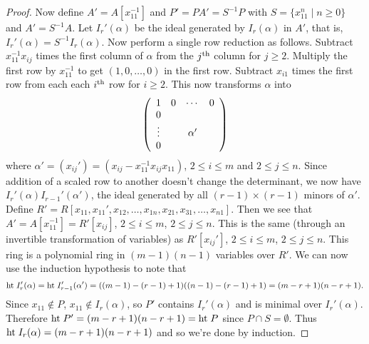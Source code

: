 \documentclass{article}
\newcommand{\Ht}{\textup{ht}\;}
\begin{document}
\begin{proof}
Now define $A' = A[x_{11}^{-1}]$ and $P' = PA' = S^{-1}P$ with $S = \{x_{11}^n \mid n \geq 0\}$ and $A' = S^{-1}A$. Let $I_r'(\alpha)$ be the ideal generated by $I_r(\alpha)$ in $A'$, that is, $I_r'(\alpha) = S^{-1}I_r(\alpha)$. Now perform a single row reduction as follows. Subtract $x_{11}^{-1}x_{ij}$ times the first column of $\alpha$ from the $j^{\textup{th}}$ column for $j \geq 2$. Multiply the first row by $x_{11}^{-1}$ to get $(1, 0, \dots , 0)$ in the first row. Subtract $x_{i1}$ times the first row from each each $i^{\textup{th}}$ row for $i \geq 2$. This now transforms $\alpha$ into
\[
\left (
\begin{array}{cccc}
1 & 0 & \cdots & 0\\
0 & \multicolumn{3}{c}{\multirow{4}{*}{$\alpha'$}}\\
\vdots &\\
0 &
\end{array}
\right )
\]
where $\alpha' = (x_{ij}') = (x_{ij} - x_{11}^{-1}x_{ij}x_{11})$, $2 \leq i \leq m$ and $2 \leq j \leq n$. Since addition of a scaled row to another doesn't change the determinant, we now have $I_r'(\alpha) I_{r-1}'(\alpha')$, the ideal generated by all $(r-1) \times (r-1)$ minors of $\alpha'$. Define $R' = R[x_{11}, x_{11}', x_{12}, \dots , x_{1n}, x_{21}, x_{31}, \dots , x_{n1}]$. Then we see that $A' = A[x_{11}^{-1}] = R'[x_{ij}]$, $2 \leq i \leq m$, $2 \leq j \leq n$. This is the same (through an invertible transformation of variables) as $R'[x_{ij}']$, $2 \leq i \leq m$, $2 \leq j \leq n$. This ring is a polynomial ring in $(m-1)(n-1)$ variables over $R'$. We can now use the induction hypothesis to note that
\[
\Ht I_r'(\alpha) = \Ht I_{r-1}'(\alpha') = ((m-1) - (r-1) + 1)((n-1) - (r-1) + 1) = (m-r+1)(n-r+1).
\]
Since $x_{11} \notin P$, $x_{11} \notin I_r(\alpha)$, so $P'$ contains $I_r'(\alpha)$ and is minimal over $I_r'(\alpha)$. Therefore $\Ht P' = (m-r+1)(n-r+1) = \Ht P$ since $P \cap S = \emptyset$. Thus $\Ht I_r(\alpha) = (m-r+1)(n-r+1)$ and so we're done by induction.
\end{proof}
\end{document}
